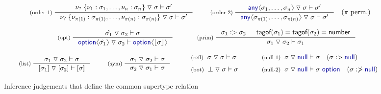 \documentclass[10pt,preprint,clearpagebib]{sigplanconf}
\newcommand{\langl}{\begin{picture}(4.5,7)
\put(1.1,2.5){\rotatebox{60}{\line(1,0){5.5}}}
\put(1.1,2.5){\rotatebox{300}{\line(1,0){5.5}}}
\end{picture}}
\newcommand{\rangl}{\begin{picture}(4.5,7)
\put(.9,2.5){\rotatebox{120}{\line(1,0){5.5}}}
\put(.9,2.5){\rotatebox{240}{\line(1,0){5.5}}}
\end{picture}}
\newcommand{\kvd}[1]{\textnormal{\textcolor{kvdclr}{\sffamily #1}}}
\newcommand{\ident}[1]{\textnormal{\sffamily #1}}
\newcommand{\tsep}[0]{\; \triangledown \;}
\newcommand{\dropopt}[1]{\lfloor#1\rfloor}
\newcommand{\tytagof}{\ident{tagof}}
\begin{document}
\begin{figure}[t]
\begin{equation*}
\inference[(order-1)\;]
  { \nu_? \; \{ \nu_1 : \sigma_1, \ldots, \nu_n : \sigma_n \} \tsep \sigma \vdash \sigma' }
  { \nu_? \; \{ \nu_{\pi(1)} : \sigma_{\pi(1)}, \ldots, \nu_{\pi(n)} : \sigma_{\pi(n)} \} \tsep \sigma \vdash \sigma' }
\quad
\inference[(order-2)\;]
  { \kvd{any}\langl\sigma_1, \ldots, \sigma_n\rangl \tsep \sigma \vdash \sigma' }
  { \kvd{any}\langl\sigma_{\pi(1)}, \ldots, \sigma_{\pi(n)}\rangl \tsep \sigma \vdash \sigma' }
\quad (\pi~\textnormal{perm.})  
\end{equation*}
\vspace{-1.75em}

\begin{equation*}
\hspace{3em}
\inference[(opt)\;]
  {\hat{\sigma_1} \tsep \sigma_2 \vdash \sigma}
  {\kvd{option}\langl\hat{\sigma_1}\rangl \tsep \sigma_2 \vdash \kvd{option}\langl\dropopt{\sigma}\rangl}
\qquad
\inference[(prim)\;]
  {\sigma_1 :> \sigma_2 &
   \tytagof(\sigma_1) = \tytagof(\sigma_2) = \ident{number} }
  {\sigma_1 \tsep \sigma_2 \vdash \sigma_1}\quad
\end{equation*}
\vspace{-2em}

\begin{equation*}
\inference[(list)\;]
  {\sigma_1 \tsep \sigma_2 \vdash \sigma}
  {[\sigma_1] \tsep [\sigma_2] \vdash [\sigma]}
\quad
\inference[(sym)\;]
  {\sigma_1 \tsep \sigma_2 \vdash \sigma}
  {\sigma_2 \tsep \sigma_1 \vdash \sigma}
%
\quad
\begin{array}{l}
 \textnormal{\footnotesize{(refl)}}\;\; \sigma \tsep \sigma \vdash \sigma\\[0.6em]
 \textnormal{\footnotesize{(bot)}}\;\; \bot \tsep \sigma \vdash \sigma
\end{array}
%
\quad
 \begin{array}{l}
 \textnormal{\footnotesize{(null-1)}}\;\; \sigma \tsep \kvd{null} \vdash \sigma \quad(\sigma :> \kvd{null}) \\[0.6em]
 \textnormal{\footnotesize{(null-2)}}\;\; \sigma \tsep \kvd{null} \vdash \sigma~\kvd{option} \quad(\sigma :\ngtr \kvd{null})
 \end{array}
\end{equation*}

\caption{Inference judgements that define the common supertype relation}
\label{fig:subtyping-cst}
\end{figure}
\end{document}
